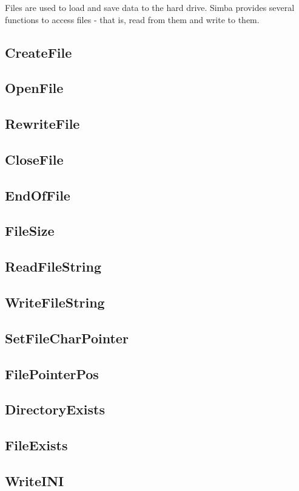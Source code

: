 \documentclass[a4paper]{report}
\begin{document}
Files are used to load and save data to the hard drive.
Simba provides several functions to access files - that is, read
from them and write to them.


\subsection{CreateFile}
\subsection{OpenFile}
\subsection{RewriteFile}
\subsection{CloseFile}
\subsection{EndOfFile}
\subsection{FileSize}
\subsection{ReadFileString}
\subsection{WriteFileString}
\subsection{SetFileCharPointer}
\subsection{FilePointerPos}
\subsection{DirectoryExists}
\subsection{FileExists}
\subsection{WriteINI}
\end{document}

